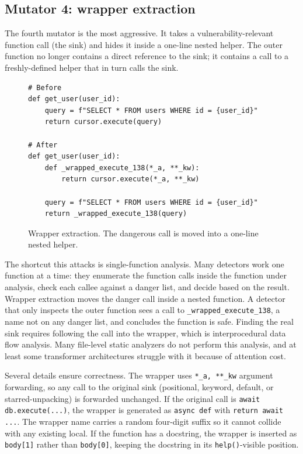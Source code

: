 \subsection{Mutator 4: wrapper extraction}
\label{sec:method:wrapper}

The fourth mutator is the most aggressive. It takes a
vulnerability-relevant function call (the sink) and hides it inside
a one-line nested helper. The outer function no longer contains a
direct reference to the sink; it contains a call to a freshly-defined
helper that in turn calls the sink.

\begin{figure}[h]
\begin{verbatim}
# Before
def get_user(user_id):
    query = f"SELECT * FROM users WHERE id = {user_id}"
    return cursor.execute(query)

# After
def get_user(user_id):
    def _wrapped_execute_138(*_a, **_kw):
        return cursor.execute(*_a, **_kw)

    query = f"SELECT * FROM users WHERE id = {user_id}"
    return _wrapped_execute_138(query)
\end{verbatim}
\caption{Wrapper extraction. The dangerous call is moved into a
one-line nested helper.}
\label{lst:wrapper}
\end{figure}

The shortcut this attacks is single-function analysis. Many detectors
work one function at a time: they enumerate the function calls
inside the function under analysis, check each callee against a
danger list, and decide based on the result. Wrapper extraction
moves the danger call inside a nested function. A detector that
only inspects the outer function sees a call to
\texttt{\_wrapped\_execute\_138}, a name not on any danger list,
and concludes the function is safe. Finding the real sink requires
following the call into the wrapper, which is interprocedural data
flow analysis. Many file-level static analyzers do not perform
this analysis, and at least some transformer architectures struggle
with it because of attention cost.

Several details ensure correctness. The wrapper uses
\texttt{*\_a, **\_kw} argument forwarding, so any call to the original
sink (positional, keyword, default, or starred-unpacking) is forwarded
unchanged. If the original call is
\texttt{await db.execute(...)}, the wrapper is generated as
\texttt{async def} with \texttt{return await ...}. The wrapper
name carries a random four-digit suffix so it cannot collide with
any existing local. If the function has a docstring, the wrapper
is inserted as \texttt{body[1]} rather than \texttt{body[0]},
keeping the docstring in its \texttt{help()}-visible position.

